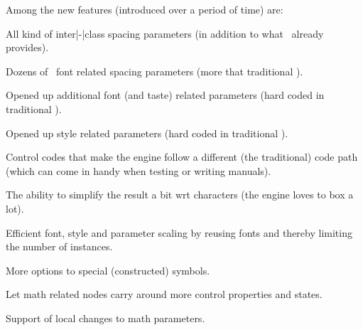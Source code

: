 \starttitle[title=Implementation]

Among the new features (introduced over a period of time) are:

\startitemize

\startitem
    All kind of inter|-|class spacing parameters (in addition to what \LUATEX\
    already provides).
\stopitem

\startitem
    Dozens of \OPENTYPE\ font related spacing parameters (more that traditional
    \TEX).
\stopitem

\startitem
    Opened up additional font (and taste) related parameters (hard coded in
    traditional \TEX).
\stopitem

\startitem
    Opened up style related parameters (hard coded in traditional \TEX).
\stopitem

\startitem
    Control codes that make the engine follow a different (the traditional) code
    path (which can come in handy when testing or writing manuals).
\stopitem

\startitem
    The ability to simplify the result a bit wrt characters (the engine loves to
    box a lot).
\stopitem

\startitem
    Efficient font, style and parameter scaling by reusing fonts and thereby
    limiting the number of instances.
\stopitem

\startitem
    More options to special (constructed) symbols.
\stopitem

\startitem
    Let math related nodes carry around more control properties and states.
\stopitem

\startitem
    Support of local changes to math parameters.
\stopitem

\stopitemize

\stoptitle

\stopdocument



